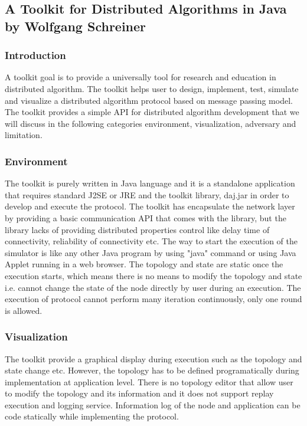 \subsection{A Toolkit for Distributed Algorithms in Java by Wolfgang Schreiner}

\subsubsection{Introduction}
A toolkit goal is to provide a universally tool for research and education in distributed algorithm. The toolkit helps user to design, implement, test, simulate and visualize a distributed algorithm protocol based on message passing model. The toolkit provides a simple API for distributed algorithm development that we will discuss in the following categories environment, visualization, adversary and limitation.

\subsubsection{Environment}
The toolkit is purely written in Java language and it is a standalone application that requires standard J2SE or JRE and the toolkit library, daj.jar in order to develop and execute the protocol. The toolkit has encapsulate the network layer by providing a basic communication API that comes with the library, but the library lacks of providing distributed properties control like delay time of connectivity, reliability of connectivity etc. The way to start the execution of the simulator is like any other Java program by using "java" command or using Java Applet running in a web browser. The topology and state are static once the execution starts, which means there is no means to modify the topology and state i.e. cannot change the state of the node directly by user during an execution. The execution of protocol cannot perform many iteration continuously, only one round is allowed.

\subsubsection{Visualization}
The toolkit provide a graphical display during execution such as the topology and state change etc. However, the topology has to be defined programatically during implementation at application level. There is no topology editor that allow user to modify the topology and its information and it does not support replay execution and logging service. Information log of the node and application can be code statically while implementing the protocol.

